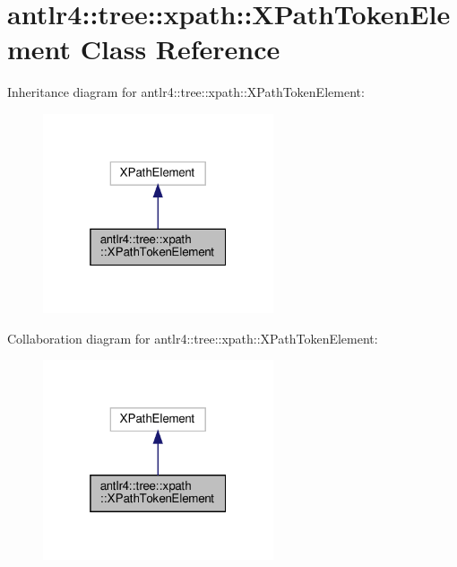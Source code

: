 \hypertarget{classantlr4_1_1tree_1_1xpath_1_1XPathTokenElement}{}\section{antlr4\+:\+:tree\+:\+:xpath\+:\+:X\+Path\+Token\+Element Class Reference}
\label{classantlr4_1_1tree_1_1xpath_1_1XPathTokenElement}


Inheritance diagram for antlr4\+:\+:tree\+:\+:xpath\+:\+:X\+Path\+Token\+Element\+:
\nopagebreak
\begin{figure}[H]
\begin{center}
\leavevmode
\includegraphics[width=193pt]{classantlr4_1_1tree_1_1xpath_1_1XPathTokenElement__inherit__graph}
\end{center}
\end{figure}


Collaboration diagram for antlr4\+:\+:tree\+:\+:xpath\+:\+:X\+Path\+Token\+Element\+:
\nopagebreak
\begin{figure}[H]
\begin{center}
\leavevmode
\includegraphics[width=193pt]{classantlr4_1_1tree_1_1xpath_1_1XPathTokenElement__coll__graph}
\end{center}
\end{figure}
